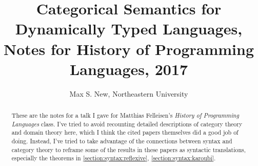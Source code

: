\documentclass{article}
\title{Categorical Semantics for Dynamically Typed Languages, Notes for History of Programming Languages, 2017}
\author{Max S. New, Northeastern University}
\begin{document}
\maketitle

\begin{abstract}
  These are the notes for a talk I gave for Matthias Felleisen's {\it
    History of Programming Languages} class.
  I've tried to avoid recounting detailed descriptions of category
  theory and domain theory here, which I think the cited papers
  themselves did a good job of doing.
  Instead, I've tried to take
  advantage of the connections between syntax and category theory to
  reframe some of the results in these papers as syntactic
  translations, especially the theorems in
  \ref{section:syntax:reflexive}, \ref{section:syntax:karoubi}.
\end{abstract}
\end{document}
